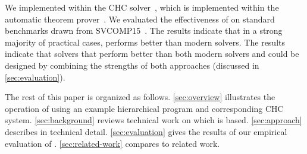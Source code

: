 We implemented \sys within the \duality CHC solver~\cite{bjorner13},
which is implemented within the \zthree automatic theorem
prover~\cite{moura08}.
%
We evaluated the effectiveness of \sys on standard benchmarks drawn
from SVCOMP15~\cite{svcomp15}.
%
The results indicate that in a strong majority of practical cases,
\sys performs better than modern solvers.
%
The results indicate that solvers that perform better than both modern
solvers and \sys could be designed by combining the strengths of both
approaches (discussed in \autoref{sec:evaluation}).

The rest of this paper is organized as follows.
%
\autoref{sec:overview} illustrates the operation of \sys using an
example hierarchical program and corresponding CHC system.
%
\autoref{sec:background} reviews technical work on which \sys is
based.
%
\autoref{sec:approach} describes \sys in technical detail.
%
\autoref{sec:evaluation} gives the results of our empirical evaluation
of \sys.
%
\autoref{sec:related-work} compares \sys to related work.

